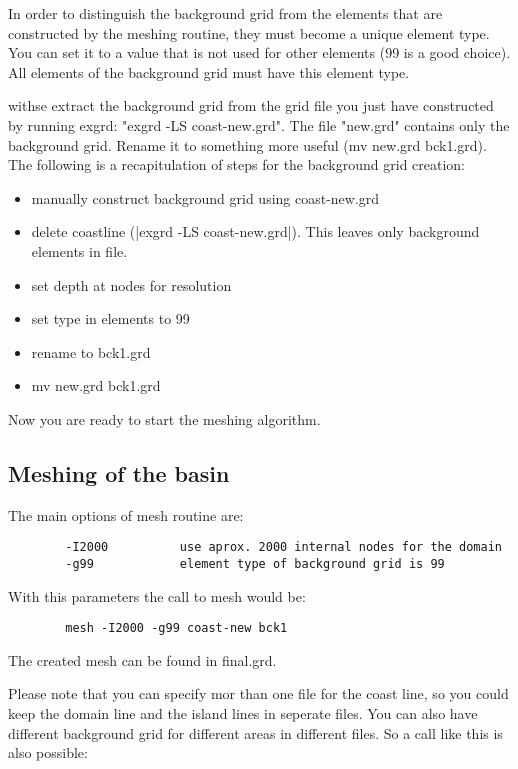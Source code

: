 In order to distinguish the background grid from the elements
that are constructed by the meshing routine, they must become
a unique element type. You can set it to a value that is not
used for other elements (99 is a good choice). All elements
of the background grid must have this element type.

withse extract the background grid from the grid file you just
have constructed by running exgrd: "exgrd -LS coast-new.grd".
The file "new.grd" contains only the background grid. Rename it to
something more useful (mv new.grd bck1.grd).
The following is a recapitulation of steps for the background grid creation:

\begin{itemize}
\item        manually construct background grid using coast-new.grd
\item        delete coastline (|exgrd -LS coast-new.grd|).
		This leaves only background elements in file.
\item        set depth at nodes for resolution
\item        set type in elements to 99 
\item        rename to bck1.grd
\item        mv new.grd bck1.grd
\end{itemize}

Now you are ready to start the meshing algorithm.

\subsection{Meshing of the basin}

The main options of mesh routine are:

\begin{verbatim}
        -I2000          use aprox. 2000 internal nodes for the domain
        -g99            element type of background grid is 99
\end{verbatim}

With this parameters the call to mesh would be:

\begin{verbatim}
        mesh -I2000 -g99 coast-new bck1
\end{verbatim}

The created mesh can be found in final.grd.

Please note that you can specify mor than one file for the coast line,
so you could keep the domain line and the island lines in seperate files.
You can also have different background grid for different areas in
different files. So a call like this is also possible:

